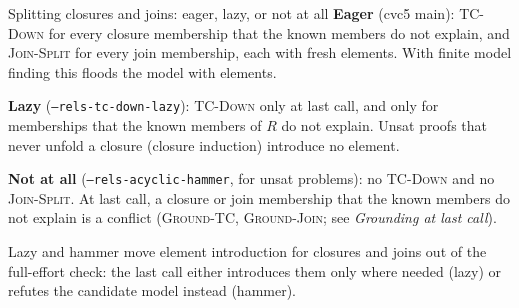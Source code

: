 \documentclass[aspectratio=169]{beamer}
\newcommand{\sm}[1]{\texttt{#1}}
\newcommand{\rn}[1]{\textsc{#1}}
\begin{document}
\begin{frame}{Splitting closures and joins: eager, lazy, or not at all}
  \small
  \textbf{Eager} (cvc5 main): \rn{TC-Down} for every closure membership that the known members
  do not explain, and \rn{Join-Split} for every join membership, each with fresh elements. With
  finite model finding this floods the model with elements.
  {\footnotesize{}
  }

  \textbf{Lazy} (\sm{--rels-tc-down-lazy}): \rn{TC-Down} only at last call, and only for
  memberships that the known members of $R$ do not explain. Unsat proofs that never unfold a
  closure (closure induction) introduce no element.
  \medskip

  \textbf{Not at all} (\sm{--rels-acyclic-hammer}, for unsat problems): no \rn{TC-Down} and no
  \rn{Join-Split}. At last call, a closure or join membership that the known members do not
  explain is a conflict (\rn{Ground-TC}, \rn{Ground-Join}; see \emph{Grounding at last call}).
  \medskip

  Lazy and hammer move element introduction for closures and joins out of the full-effort
  check: the last call either introduces them only where needed (lazy) or refutes the
  candidate model instead (hammer).
\end{frame}
\end{document}
